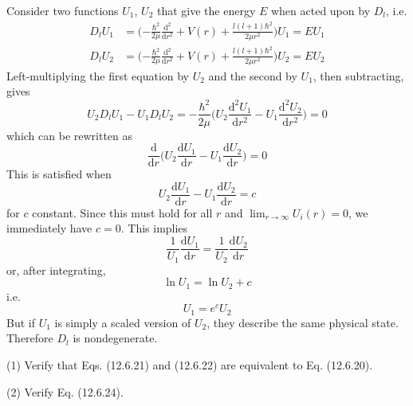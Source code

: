 \documentclass[../principles-of-quantum-mechanics.tex]{subfiles}
\begin{document}
\begin{questions}
		\begin{solution}
			Consider two functions $U_1$, $U_2$ that give the energy $E$ when acted upon by $D_l$, i.e.
			\begin{align*}
				D_lU_1 &= \Big({-\frac{\hbar^2}{2\mu}}\frac{\mathrm{d}^2}{\mathrm{d}r^2} + V(r) + \frac{l(l + 1)\hbar^2}{2\mu r^2}\Big)U_1 = EU_1 \\
				D_lU_2 &= \Big({-\frac{\hbar^2}{2\mu}}\frac{\mathrm{d}^2}{\mathrm{d}r^2} + V(r) + \frac{l(l + 1)\hbar^2}{2\mu r^2}\Big)U_2 = EU_2
			\end{align*}
			Left-multiplying the first equation by $U_2$ and the second by $U_1$, then subtracting, gives
			$$U_2D_lU_1 - U_1D_lU_2 = {-\frac{\hbar^2}{2\mu}}\Big(U_2\frac{\mathrm{d}^2U_1}{\mathrm{d}r^2} - U_1\frac{\mathrm{d}^2U_2}{\mathrm{d}r^2}\Big) = 0$$
			which can be rewritten as
			$$\frac{\mathrm{d}}{\mathrm{d}r}\Big(U_2\frac{\mathrm{d}U_1}{\mathrm{d}r} - U_1\frac{\mathrm{d}U_2}{\mathrm{d}r}\Big) = 0$$
			This is satisfied when
			$$U_2\frac{\mathrm{d}U_1}{\mathrm{d}r} - U_1\frac{\mathrm{d}U_2}{\mathrm{d}r} = c$$
			for $c$ constant. Since this must hold for all $r$ and $\lim_{r\to\infty}U_i(r) = 0$, we immediately have $c = 0$. This implies
			$$\frac{1}{U_1}\frac{\mathrm{d}U_1}{\mathrm{d}r} = \frac{1}{U_2}\frac{\mathrm{d}U_2}{\mathrm{d}r}$$
			or, after integrating,
			$$\ln U_1 = \ln U_2 + c$$
			i.e.
			$$U_1 = e^c U_2$$
			But if $U_1$ is simply a scaled version of $U_2$, they describe the same physical state. Therefore $D_l$ is nondegenerate.
		\end{solution}
	
		\question (1) Verify that Eqs. (12.6.21) and (12.6.22) are equivalent to Eq. (12.6.20).
		
		(2) Verify Eq. (12.6.24).
		

\end{questions}
\end{document}
